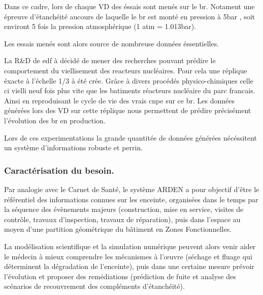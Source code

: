 Dans ce cadre, lors de chaque \gls{VD} des éssais sont menés sur le \acrshort{br}. Notament une épreuve d'étanchéité aucours de laquelle le \gls{br} est monté en pression à 5bar , soit environt 5 fois la pression atmosphérique (1 atm = 1.013bar).

Les essais menés sont alors source de nombreuse données éssentielles.

La R\&D de \gls{edf} à décidé de mener des recherches pouvant prédire le comportement du viellisement des reacteurs nucléaires. Pour cela une réplique éxacte à l'échelle 1/3 à été crée. Grâce à divers procédés physico-chimiques celle ci vielli neuf fois plus vite que les batiments réacteurs nucléaire du parc francais. Ainsi en reproduisant le cycle de vie des vrais \gls{cnpe} sur ce \gls{br}. Les données générées lors des \gls{VD} sur cette réplique nous permettent de prédire précisément l'évolution des \gls{br} en production.

Lors de ces experimentations la grande quantitée de données générées nécéssitent un système d'informations robuste et perrin.
\subsubsection{Caractérisation du besoin.}

Par analogie avec le Carnet de Santé, le système ARDEN a pour objectif d’être le référentiel des informations connues   sur   les   enceinte,   organisées dans   le   temps   par   la   séquence   des   évènements   majeurs (construction, mise en service, visites de contrôle, travaux d’inspection, travaux de réparation), puis dans l’espace au moyen d’une partition géométrique du bâtiment en Zones Fonctionnelles.

La  modélisation  scientifique  et  la simulation  numérique  peuvent  alors  venir  aider  le  médecin  à  mieux comprendre les mécanismes à l’œuvre (séchage et fluage qui déterminent la dégradation de l’enceinte), puis dans une certaine mesure prévoir l’évolution et proposer des remédiations (prédiction  de  fuite  et analyse des scénarios de recouvrement des compléments d’étanchéité).


